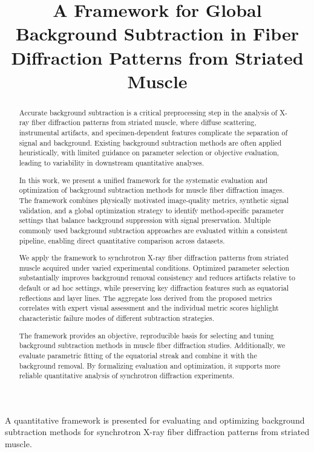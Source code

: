 \documentclass[iucr]{iucrjournals}
\title{A Framework for Global Background Subtraction in Fiber Diffraction Patterns from Striated Muscle}
\author{}
\date{}
\begin{document}
\maketitle

\begin{synopsis}
A quantitative framework is presented for evaluating and optimizing background subtraction methods for synchrotron X-ray fiber diffraction patterns from striated muscle.
\end{synopsis}


\begin{abstract}

Accurate background subtraction is a critical preprocessing step in the analysis of X-ray fiber diffraction patterns from striated muscle, where diffuse scattering, instrumental artifacts, and specimen-dependent features complicate the separation of signal and background. Existing background subtraction methods are often applied heuristically, with limited guidance on parameter selection or objective evaluation, leading to variability in downstream quantitative analyses.

In this work, we present a unified framework for the systematic evaluation and optimization of background subtraction methods for muscle fiber diffraction images. The framework combines physically motivated image-quality metrics, synthetic signal validation, and a global optimization strategy to identify method-specific parameter settings that balance background suppression with signal preservation. Multiple commonly used background subtraction approaches are evaluated within a consistent pipeline, enabling direct quantitative comparison across datasets.

We apply the framework to synchrotron X-ray fiber diffraction patterns from striated muscle acquired under varied experimental conditions. Optimized parameter selection substantially improves background removal consistency and reduces artifacts relative to default or ad hoc settings, while preserving key diffraction features such as equatorial reflections and layer lines. The aggregate loss derived from the proposed metrics correlates with expert visual assessment and the individual metric scores highlight characteristic failure modes of different subtraction strategies.

The framework provides an objective, reproducible basis for selecting and tuning background subtraction methods in muscle fiber diffraction studies. Additionally, we evaluate parametric fitting of the equatorial streak and combine it with the background removal. By formalizing evaluation and optimization, it supports more reliable quantitative analysis of synchrotron diffraction experiments.


\end{abstract}
\end{document}
